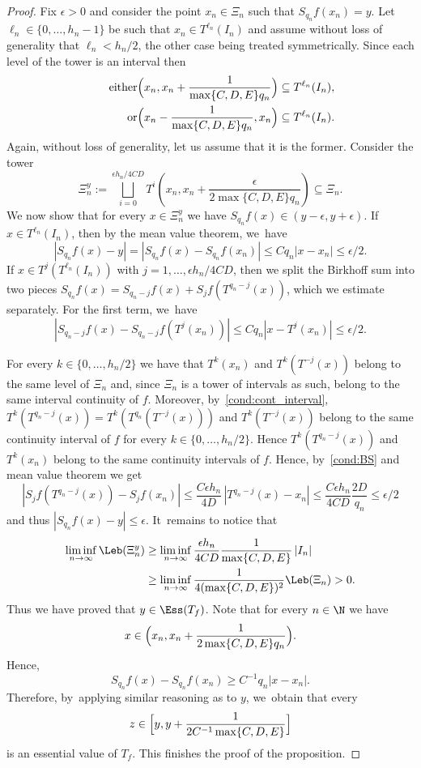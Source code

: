 \begin{proof}
Fix $\epsilon>0$ and consider the point {$x_n \in \Xi_n$ such that $S_{q_n}f(x_n)=y$}.
Let $\ell_n\in\{0,\ldots,h_n-1\}$ be such that $x_n\in T^{\ell_n}(I_n)$ and assume without loss of generality that $\ell_n<h_{n}/2$, the other case being treated symmetrically. Since each level of the tower is an interval then
\begin{align*}
\tag*{either}
\Bigl(x_n,x_n+\frac{1}{\max\{C, D,E\} q_n}\Bigr)\subseteq T^{\ell_n}(I_n),\\
\tag*{or} \Bigl(x_n-\frac{1}{\max\{C,D,E\} q_n},x_n\Bigr)\subseteq T^{\ell_n}(I_n).
\end{align*}
Again, without loss of generality, let us assume that it is the former. Consider the tower
\[
\Xi_n^y:=\bigsqcup_{i=0}^{\epsilon h_n/4CD} T^i\left(x_n,x_n+\frac{\epsilon}{2\max\{C,D,E\} q_n}\right)\subseteq \Xi_n.
\]
We now show that for every $x\in \Xi_n^y$ we have $S_{q_n}f(x)\in(y-\epsilon,y+\epsilon)$. If $x\in T^{\ell_n}(I_n)$, then by the mean value theorem, we~have
\[
\left|S_{q_n}f(x)-y\right|=\left|S_{q_n}f(x)-S_{q_n}f(x_n)\right|\le Cq_n|x-x_n|\le \epsilon/2.
\]
If $x\in T^{j} (T^{\ell_n}(I_n))$ with $j=1,\ldots,\epsilon h_n/4CD$, then we
split the Birkhoff sum into two pieces $S_{q_n}f(x) = S_{q_n - j}f (x) +
S_jf(T^{q_n - j}(x))$, which we estimate separately. For the first term, we~have
\[
\left|S_{q_n-j} f(x)-S_{q_n-j} f(T^j(x_n))\right|\le Cq_n|x-T^j(x_n)|\le\epsilon/2.
\]

For every $k\in\{0,\ldots,h_n/2\}$ we have that $T^{k}(x_n)$ and
$T^{k}(T^{-j}(x))$ belong to the same level of $\Xi_n$ and, since $\Xi_n$ is a
tower of intervals as such, belong to the same interval continuity of $f$.
Moreover, by~\eqref{cond:cont_interval}, $T^k(T^{q_n-j}(x))=T^k(T^{q_n}(T^{-j}(x)))$ and
$T^{k}(T^{-j}(x))$ belong to the same
continuity interval of $f$ for every $k\in\{0,\ldots,h_n/2\}$. Hence
$T^k(T^{q_n-j}(x))$ and $T^k(x_n)$ belong to the same continuity intervals of
$f$. Hence, by~\eqref{cond:BS} and mean value theorem we
get
\[
\left|S_j f(T^{q_n-j}(x))-S_j f(x_n)\right|\le \frac{C\epsilon h_n}{4D}\,|T^{q_n-j}(x)-x_n|\le \frac{C\epsilon h_n}{4CD} \frac{2D}{q_n}\le\epsilon/2
\]
and thus $|S_{q_n} f(x)-y|\le \epsilon$. It~remains to notice that
\begin{align*}
\liminf_{n\to\infty}\Leb(\Xi_n^y)&\ge \liminf_{n\to\infty}\frac{\epsilon h_n}{4CD}\frac{1}{\max\{C,D,E\}}\,|I_n|\\
&\ge \liminf_{n\to\infty} \frac{1}{4(\max\{C,D,E\})^2}\Leb(\Xi_n)>0.
\end{align*}
Thus we have proved that $y\in \Ess(T_f)$. Note that for every $n\in\N$ {we have}
\[
x\in \Bigl(x_n,x_n+\frac{1}{2\max\{C,D,E\} q_n}\Bigr).
\]
Hence,
\[
S_{q_n}f(x)-S_{q_n}f(x_n)\ge C^{-1}q_n |x-x_n|.
\]
Therefore, by~applying similar reasoning as to $y$, we~obtain that every
\[
z\in\Bigl[y,y+\frac{1}{2C^{-1}\max\{C,D,E\}}\Bigr]
\]
is an essential value of $T_f$. This finishes the proof of the proposition.
\end{proof}
